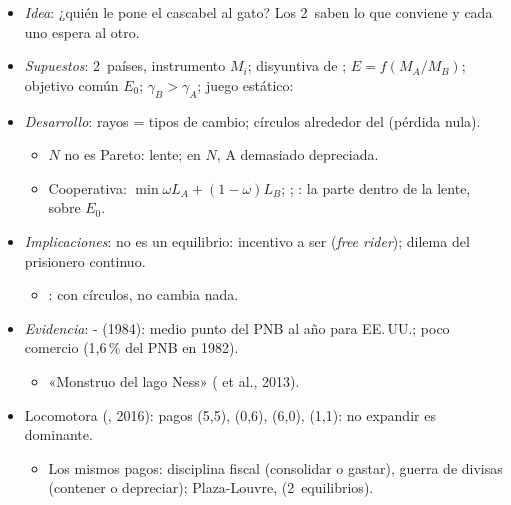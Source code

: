 \documentclass{article}
\begin{document}
\begin{columnas}
\begin{itemize}
\item \emph{Idea}: ¿quién le pone el cascabel al gato? Los 2~saben lo que conviene y cada uno espera al otro.
\item \emph{Supuestos}: 2~países, instrumento $M_i$; disyuntiva de ; $E=f(M_A/M_B)$; objetivo común $E_0$; $\gamma_B>\gamma_A$; juego estático:
\end{itemize}
\begin{itemize}
\item \emph{Desarrollo}: rayos = tipos de cambio; círculos alrededor del  (pérdida nula).
  \begin{itemize}
  \item $N$ no es Pareto: lente; en $N$, A demasiado depreciada.
  \item Cooperativa: $\min\omega L_A+(1-\omega)L_B$; ; : la parte dentro de la lente, sobre $E_0$.
  \end{itemize}
\item \emph{Implicaciones}: no es un equilibrio: incentivo a ser  (\emph{free rider}); dilema del prisionero continuo.
  \begin{itemize}
  \item {}: con círculos, no cambia nada.
  \end{itemize}
\item \emph{Evidencia}: - (1984): medio punto del PNB al año para EE.\,UU.; poco comercio (1,6\,\% del PNB en 1982).
  \begin{itemize}
  \item «Monstruo del lago Ness» ( et al., 2013).
  \end{itemize}
\end{itemize}
\begin{itemize}
\item Locomotora (, 2016): pagos (5,5), (0,6), (6,0), (1,1): no expandir es dominante.
  \begin{itemize}
  \item Los mismos pagos: disciplina fiscal (consolidar o gastar), guerra de divisas (contener o depreciar); Plaza-Louvre,  (2~equilibrios).

\end{itemize}
\end{itemize}
\end{columnas}
\end{document}
